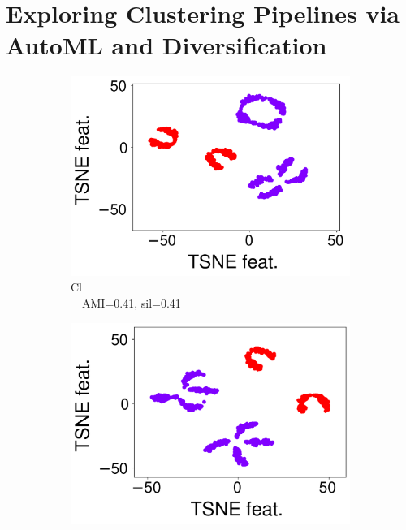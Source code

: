 
\chapter{Exploring Clustering Pipelines via AutoML and Diversification}
\label{data-centric-chap:unsupervised}

\begin{figure}
    \centering
    \begin{subfigure}[b]{0.23\columnwidth}
        \centering
        \includegraphics[scale=.15]{chapters/data-centric/unsupervised/img/cl.pdf}
        \caption{Cl\\$\quad$AMI=0.41, sil=0.41}
        \label{clustering-fig:ca3}
    \end{subfigure}
    \hfill
    \begin{subfigure}[b]{0.23\columnwidth}
        \centering
        \includegraphics[scale=.15]{chapters/data-centric/unsupervised/img/ft_cl.pdf}

\end{subfigure}
\end{figure}
